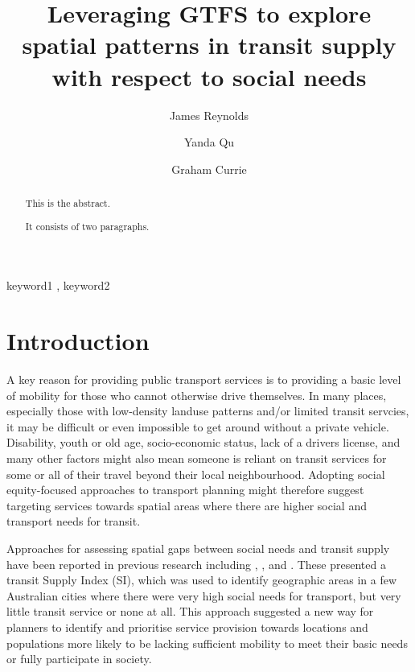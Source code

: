\documentclass[preprint, 3p,
authoryear]{elsarticle} %
\begin{document}
\begin{frontmatter}

  \title{Leveraging GTFS to explore spatial patterns in transit supply
with respect to social needs}
    \author[Public Transport Research Group (PTRG)]{James Reynolds%
  }
    \author[Public Transport Research Group (PTRG)]{Yanda Qu%
  }
    \author[Public Transport Research Group (PTRG)]{Graham Currie%
  }
  
  \begin{abstract}
  This is the abstract.

  It consists of two paragraphs.
  \end{abstract}
    \begin{keyword}
    keyword1 \sep 
    keyword2
  \end{keyword}
  
 \end{frontmatter}

\section{Introduction}\label{introduction}

A key reason for providing public transport services is to providing a
basic level of mobility for those who cannot otherwise drive themselves.
In many places, especially those with low-density landuse patterns
and/or limited transit servcies, it may be difficult or even impossible
to get around without a private vehicle. Disability, youth or old age,
socio-economic status, lack of a drivers license, and many other factors
might also mean someone is reliant on transit services for some or all
of their travel beyond their local neighbourhood. Adopting social
equity-focused approaches to transport planning might therefore suggest
targeting services towards spatial areas where there are higher social
and transport needs for transit.

Approaches for assessing spatial gaps between social needs and transit
supply have been reported in previous research including
\citet{Currie2003Hobart}, \citet{Currie2004Gap},
\citet{Currie2007Identifying} and \citet{currie2010identifying}. These
presented a transit Supply Index (SI), which was used to identify
geographic areas in a few Australian cities where there were very high
social needs for transport, but very little transit service or none at
all. This approach suggested a new way for planners to identify and
prioritise service provision towards locations and populations more
likely to be lacking sufficient mobility to meet their basic needs or
fully participate in society.
\end{document}
